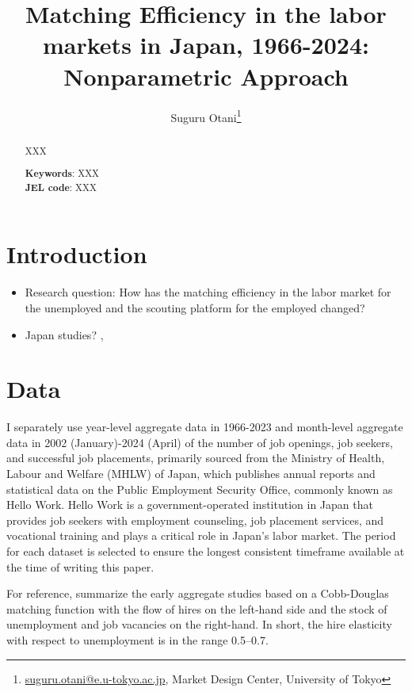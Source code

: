 \documentclass[12pt]{article}
\begin{document}
\title{Matching Efficiency in the labor markets in Japan, 1966-2024: Nonparametric Approach}
\author{Suguru Otani\thanks{\href{mailto:}{suguru.otani@e.u-tokyo.ac.jp}, Market Design Center, University of Tokyo}}
\maketitle

\begin{abstract}
\noindent
XXX

\textbf{Keywords}: XXX \\
\textbf{JEL code}: XXX
\end{abstract}

\section{Introduction}

\begin{itemize}
    \item Research question: How has the matching efficiency in the labor market for the unemployed and the scouting platform for the employed changed?
\end{itemize}

\begin{itemize}
    \item Japan studies? \cite{kawata2021first}, \cite{fukai2021describing}
\end{itemize}

\section{Data}

I separately use year-level aggregate data in 1966-2023 and month-level aggregate data in 2002 (January)-2024 (April) of the number of job openings, job seekers, and successful job placements, primarily sourced from the Ministry of Health, Labour and Welfare (MHLW) of Japan, which publishes annual reports and statistical data on the Public Employment Security Office, commonly known as Hello Work. 
Hello Work is a government-operated institution in Japan that provides job seekers with employment counseling, job placement services, and vocational training and plays a critical role in Japan's labor market.
The period for each dataset is selected to ensure the longest consistent timeframe available at the time of writing this paper.

For reference, \cite{petrongolo2001looking} summarize the early aggregate studies based on a Cobb-Douglas matching function with the flow of hires on the left-hand side and the stock of unemployment and job vacancies on the right-hand. 
In short, the hire elasticity with respect to unemployment is in the range 0.5–0.7.
\end{document}
